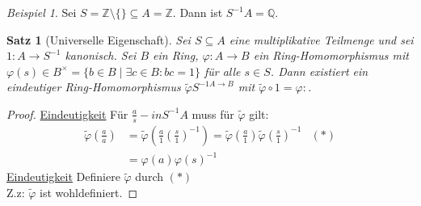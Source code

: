\documentclass[10pt,a4paper]{article}
\newcommand{\Z}{\ensuremath{\mathbb{Z}}}
\newcommand{\Q}{\ensuremath{\mathbb{Q}}}
\newcounter{thm}[section]
\theoremstyle{definition}
\theoremstyle{plain}
\newtheorem{satz}[thm]{Satz}
\theoremstyle{remark}
\newtheorem*{exm*}{Beispiel}
\begin{document}
\begin{exm*}
	Sei $S=\Z\setminus \{\}\subseteq A=\Z$. Dann ist $S^{-1}A=\Q$.
\end{exm*}

\begin{satz}[Universelle Eigenschaft]\label{404satzUniv}
	Sei $S\subseteq A$ eine multiplikative Teilmenge und sei $1:A\rightarrow S^{-1}$ kanonisch. Sei $B$ ein Ring, $\varphi:A\rightarrow B$ ein Ring-Homomorphismus mit $\varphi(s)\in B^\times=\{b\in B\mid  \exists c\in B: bc=1\}$ für alle $s\in S$. Dann existiert ein eindeutiger Ring-Homomorphismus $\tilde{\varphi}S^{-1 A\rightarrow B}$ mit $\tilde{\varphi}\circ 1=\varphi:$.
	
	\begin{center}
	\end{center}
\end{satz}
\begin{proof}
	\underline{Eindeutigkeit} Für $\frac{a}{s}-in S^{-1}A$ muss für $\tilde{\varphi}$ gilt:
	\begin{align*}
	\tilde\varphi\left(\frac{a}{a}\right)&=\tilde{\varphi}\left(\frac{a}{1}\left(\frac{s}{1}\right)^{-1}\right)=\tilde{\varphi}\left(\frac{a}{1}\right)\tilde{\varphi}\left(\frac{s}{1}\right)^{-1}&(*)\\
	&=\varphi(a)\varphi(s)^{-1}
	\end{align*}
	\underline{Eindeutigkeit}
	Definiere $\tilde\varphi$ durch $(*)$\\
	Z.z: $\tilde\varphi$ ist wohldefiniert.
\end{proof}
\end{document}
